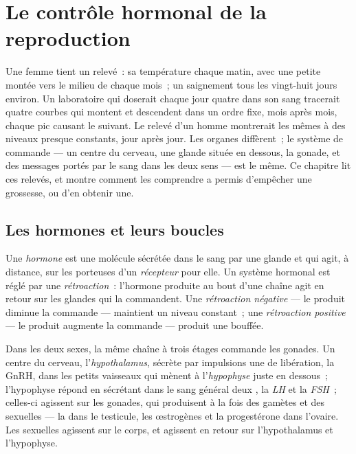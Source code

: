 \chapter{Le contrôle hormonal de la reproduction}\label{ch:g11:hormones-and-reproduction}

Une femme tient un relevé~: sa température chaque matin, avec une
petite montée vers le milieu de chaque mois~; un saignement tous les
vingt-huit jours environ. Un laboratoire qui doserait chaque jour
quatre  dans son sang tracerait quatre courbes qui montent et
descendent dans un ordre fixe, mois après mois, chaque pic causant le
suivant. Le relevé d'un homme montrerait les mêmes  à des
niveaux presque constants, jour après jour. Les organes diffèrent~; le
système de commande --- un centre du cerveau, une glande située en
dessous, la gonade, et des messages portés par le sang dans les deux
sens --- est le même. Ce chapitre lit ces relevés, et montre comment
les comprendre a permis d'empêcher une grossesse, ou d'en obtenir une.

\section{Les hormones et leurs boucles}

\begin{definition}\label{def:g11:hormones-and-reproduction:hormone}
Une \emph{hormone} est une molécule sécrétée dans le
sang par une glande et qui agit, à distance, sur les  porteuses
d'un \emph{récepteur} pour elle. Un système hormonal est réglé par une
\emph{rétroaction}~: l'hormone produite au bout
d'une chaîne agit en retour sur les glandes qui la commandent. Une
\emph{rétroaction négative} --- le produit diminue la commande ---
maintient un niveau constant~; une \emph{rétroaction positive} --- le
produit augmente la commande --- produit une bouffée.
\end{definition}

\begin{proposition}\label{prop:g11:hormones-and-reproduction:chain}
Dans les deux sexes, la même chaîne à trois étages commande les
gonades. Un centre du cerveau, l'\emph{hypothalamus}, sécrète par
impulsions une  de libération, la GnRH, dans les petits
vaisseaux qui mènent à l'\emph{hypophyse} juste en dessous~;
l'hypophyse répond en sécrétant dans le sang général deux , la
\emph{LH} et la \emph{FSH}~; celles-ci agissent sur les gonades, qui
produisent à la fois des gamètes et des  sexuelles --- la
 dans le testicule, les œstrogènes et la progestérone dans
l'ovaire. Les  sexuelles agissent sur le corps, et agissent en
retour sur l'hypothalamus et l'hypophyse.
\end{proposition}
\admitted

